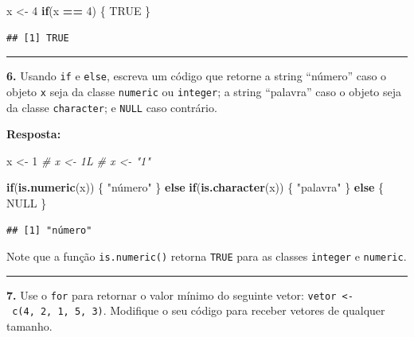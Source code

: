 \documentclass[
]{book}
\newenvironment{Shaded}{\begin{snugshade}}{\end{snugshade}}
\newcommand{\CommentTok}[1]{\textcolor[rgb]{0.56,0.35,0.01}{\textit{#1}}}
\newcommand{\ControlFlowTok}[1]{\textcolor[rgb]{0.13,0.29,0.53}{\textbf{#1}}}
\newcommand{\DecValTok}[1]{\textcolor[rgb]{0.00,0.00,0.81}{#1}}
\newcommand{\KeywordTok}[1]{\textcolor[rgb]{0.13,0.29,0.53}{\textbf{#1}}}
\newcommand{\NormalTok}[1]{#1}
\newcommand{\OperatorTok}[1]{\textcolor[rgb]{0.81,0.36,0.00}{\textbf{#1}}}
\newcommand{\OtherTok}[1]{\textcolor[rgb]{0.56,0.35,0.01}{#1}}
\newcommand{\StringTok}[1]{\textcolor[rgb]{0.31,0.60,0.02}{#1}}
\begin{document}
\begin{Shaded}
\begin{Highlighting}[]
\NormalTok{x <{-}}\StringTok{ }\DecValTok{4}
\ControlFlowTok{if}\NormalTok{(x }\OperatorTok{==}\StringTok{ }\DecValTok{4}\NormalTok{) \{}
  \OtherTok{TRUE}
\NormalTok{\}}
\end{Highlighting}
\end{Shaded}

\begin{verbatim}
## [1] TRUE
\end{verbatim}

\begin{center}\rule{0.5\linewidth}{0.5pt}\end{center}

\textbf{6.} Usando \texttt{if} e \texttt{else}, escreva um código que retorne a string ``número'' caso o objeto \texttt{x} seja da classe \texttt{numeric} ou \texttt{integer}; a string ``palavra'' caso o objeto seja da classe \texttt{character}; e \texttt{NULL} caso contrário.

\textbf{Resposta:}

\begin{Shaded}
\begin{Highlighting}[]
\NormalTok{x <{-}}\StringTok{ }\DecValTok{1}
\CommentTok{\# x <{-} 1L}
\CommentTok{\# x <{-} "1"}

\ControlFlowTok{if}\NormalTok{(}\KeywordTok{is.numeric}\NormalTok{(x)) \{}
  \StringTok{"número"}
\NormalTok{\} }\ControlFlowTok{else} \ControlFlowTok{if}\NormalTok{(}\KeywordTok{is.character}\NormalTok{(x)) \{}
  \StringTok{"palavra"}
\NormalTok{\} }\ControlFlowTok{else}\NormalTok{ \{ }
  \OtherTok{NULL}
\NormalTok{\}}
\end{Highlighting}
\end{Shaded}

\begin{verbatim}
## [1] "número"
\end{verbatim}

Note que a função \texttt{is.numeric()} retorna \texttt{TRUE} para as classes \texttt{integer} e \texttt{numeric}.

\begin{center}\rule{0.5\linewidth}{0.5pt}\end{center}

\textbf{7.} Use o \texttt{for} para retornar o valor mínimo do seguinte vetor: \texttt{vetor\ \textless{}-\ c(4,\ 2,\ 1,\ 5,\ 3)}. Modifique o seu código para receber vetores de qualquer tamanho.
\end{document}
